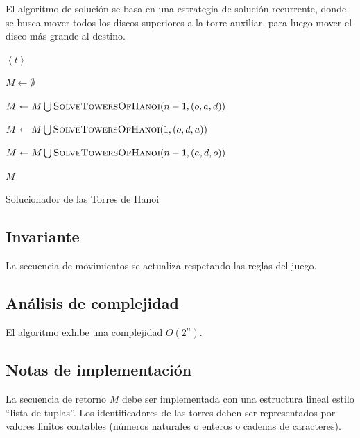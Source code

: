 \documentclass[twoside,spanish]{elsarticle}
\theoremstyle{plain}
\theoremstyle{definition}
\begin{document}
El algoritmo de solución se basa en una estrategia de solución recurrente,
donde se busca mover todos los discos superiores a la torre auxiliar,
para luego mover el disco más grande al destino.

\begin{algorithm}
\begin{algorithm}[H]

\begin{algorithmic}[1]





    \State\Return$\left\langle t\right\rangle $

  \Else

    \State$M\leftarrow\emptyset$

    \State$M\leftarrow M\bigcup\text{\Call{SolveTowersOfHanoi}{\ensuremath{n-1,\left(o,a,d\right)}}}$

    \State$M\leftarrow M\bigcup\text{\Call{SolveTowersOfHanoi}{\ensuremath{1,\left(o,d,a\right)}}}$

    \State$M\leftarrow M\bigcup\text{\Call{SolveTowersOfHanoi}{\ensuremath{n-1,\left(a,d,o\right)}}}$

    \State\Return$M$

  \EndIf

\EndProcedure

\end{algorithmic}

\end{algorithm}

\caption{Solucionador de las Torres de Hanoi}

\end{algorithm}


\subsection{Invariante}

La secuencia de movimientos se actualiza respetando las reglas del
juego.

\subsection{Análisis de complejidad}

El algoritmo exhibe una complejidad $O\left(2^{n}\right)$.

\subsection{Notas de implementación}

La secuencia de retorno $M$ debe ser implementada con una estructura
lineal estilo ``lista de tuplas''. Los identificadores de las torres
deben ser representados por valores finitos contables (números naturales
o enteros o cadenas de caracteres).
\end{document}
